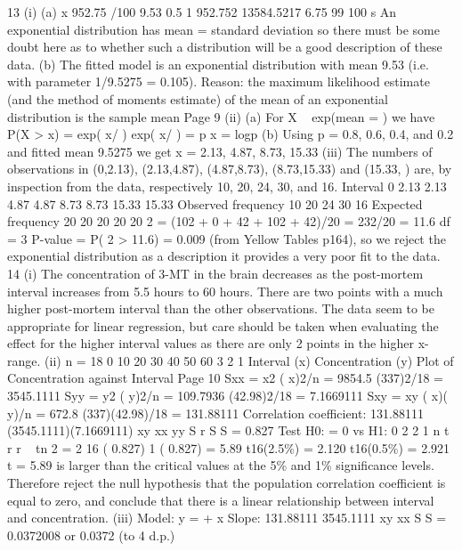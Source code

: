 \documentclass[a4paper,12pt]{article}
\begin{document}
13 (i) (a) x 952.75 /100 9.53
0.5
1 952.752
13584.5217 6.75
99 100
s
An exponential distribution has mean = standard deviation so there
must be some doubt here as to whether such a distribution will be a
good description of these data.
(b) The fitted model is an exponential distribution with mean 9.53
(i.e. with parameter 1/9.5275 = 0.105).
Reason: the maximum likelihood estimate (and the method of
moments estimate) of the mean of an exponential distribution is the
sample mean
Page 9
(ii) (a) For X ~ exp(mean = ) we have P(X > x) = exp( x/ )
exp( x/ ) = p x = logp
(b) Using p = 0.8, 0.6, 0.4, and 0.2 and fitted mean 9.5275
we get x = 2.13, 4.87, 8.73, 15.33
(iii) The numbers of observations in (0,2.13), (2.13,4.87), (4.87,8.73), (8.73,15.33)
and (15.33, ) are, by inspection from the data, respectively 10, 20, 24, 30,
and 16.
Interval 0 2.13 2.13 4.87 4.87 8.73 8.73 15.33 15.33
Observed frequency 10 20 24 30 16
Expected frequency 20 20 20 20 20
2 = (102 + 0 + 42 + 102 + 42)/20 = 232/20 = 11.6
df = 3
P-value = P( 2 > 11.6) = 0.009 (from Yellow Tables p164), so we reject the
exponential distribution as a description it provides a very poor fit to the
data.
14 (i)
The concentration of 3-MT in the brain decreases as the post-mortem interval increases from 5.5 hours to 60 hours. There are two points with a much higher post-mortem interval than the other observations.
The data seem to be appropriate for linear regression, but care should be taken when evaluating the effect for the higher interval values as there are only 2 points in the higher x-range.
(ii) n = 18
0 10 20 30 40 50 60
3
2
1
Interval (x)
Concentration (y)
Plot of Concentration against Interval
Page 10
Sxx = x2 ( x)2/n
= 9854.5 (337)2/18
= 3545.1111
Syy = y2 ( y)2/n
= 109.7936 (42.98)2/18
= 7.1669111
Sxy = xy ( x)( y)/n
= 672.8 (337)(42.98)/18
= 131.88111
Correlation coefficient:
131.88111
(3545.1111)(7.1669111)
xy
xx yy
S
r
S S
= 0.827
Test H0: = 0 vs H1: 0
2
2
1
n
t r
r
~ tn 2
= 2
16
( 0.827)
1 ( 0.827)
= 5.89
t16(2.5\%) = 2.120
t16(0.5\%) = 2.921
t = 5.89 is larger than the critical values at the 5\% and 1\% significance levels. Therefore reject the null hypothesis that the population correlation coefficient is equal to zero, and conclude that there is a linear relationship
between interval and concentration.
(iii) Model: y = + x
Slope:
131.88111
3545.1111
xy
xx
S
S
= 0.0372008 or 0.0372 (to 4 d.p.)
\end{document}
